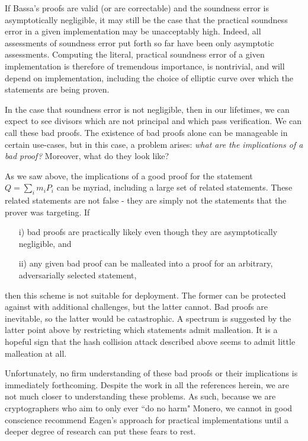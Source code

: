 \documentclass{article}
\theoremstyle{definition}
\newcommand{\6}{\mathbf}
\newcommand{\7}{\mathcal}
\begin{document}
If Bassa's proofs are valid (or are correctable) and the soundness error is asymptotically negligible, it may still be the case that the practical soundness error in a given implementation may be unacceptably high. Indeed, all assessments of soundness error put forth so far have been only asymptotic assessments. Computing the literal, practical soundness error of a given implementation is therefore of tremendous importance, is nontrivial, and will depend on implementation, including the choice of elliptic curve over which the statements are being proven.

In the case that soundness error is not negligible, then in our lifetimes, we can expect to see divisors which are not principal and which pass verification. We can call these bad proofs. The existence of bad proofs alone can be manageable in certain use-cases, but in this case, a problem arises: \textit{what are the implications of a bad proof?} Moreover, what do they look like?

As we saw above, the implications of a good proof for the statement $Q = \sum_i m_i P_i$ can be myriad, including a large set of related statements. These related statements are not false - they are simply not the statements that the prover was targeting.  If
\begin{itemize}
    \item[i)] bad proofs are practically likely even though they are asymptotically negligible, and

    \item[ii)] any given bad proof can be malleated into a proof for an arbitrary, adversarially selected statement,
\end{itemize}
then this scheme is not suitable for deployment. The former can be protected against with additional challenges, but the latter cannot. Bad proofs are inevitable, so the latter would be catastrophic. A  spectrum is suggested by the latter point above by restricting which statements admit malleation.  It is a hopeful sign that the hash collision attack described above seems to admit little malleation at all.


Unfortunately, no firm understanding of these bad proofs or their implications is immediately forthcoming. Despite the work in all the references herein, we are not much closer to understanding these problems.
As such, because we are cryptographers who aim to only ever ``do no harm" Monero, we cannot in good conscience recommend Eagen's approach for practical implementations until a deeper degree of research can put these fears to rest.
\end{document}
